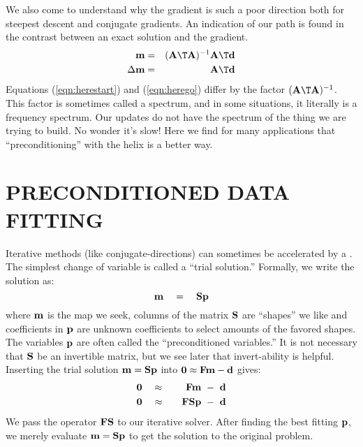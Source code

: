 \par
We also come to understand why the gradient is such a poor direction
both for steepest descent and conjugate gradients.
An indication of our path is found in the contrast between
an exact solution and the gradient.
\begin{eqnarray}
\label{eqn:herestart}
\bold m &=& (\bold A\T\bold A)^{-1}\bold A\T\bold d
\\
\label{eqn:herego}
\Delta \bold m &=& \quad\quad\quad \bold A\T\bold d
\end{eqnarray}
Equations
(\ref{eqn:herestart}) and
(\ref{eqn:herego})
differ by the factor $(\bold A\T\bold A)^{-1}$.
This factor is sometimes called a spectrum,
and in some situations,
it literally is a frequency spectrum.
Our updates do not have the spectrum
of the thing we are trying to build.
No wonder it's slow!
Here we find for many applications that
``preconditioning'' with the helix is a better way.



\section{PRECONDITIONED DATA FITTING}
\par
Iterative methods (like conjugate-directions) can sometimes be accelerated
by a .
The simplest change of variable is called a ``trial solution.''
Formally, we write the solution as:
\begin{equation}
\bold m \quad =\quad \bold S \bold p
\end{equation}
where $\bold m$ is the map we seek,
columns of the matrix $\bold S$ are ``shapes'' we like
and coefficients in $\bold p$ are unknown coefficients
to select amounts of the favored shapes.
The variables $\bold p$  are often called the ``preconditioned variables.''
It is not necessary that $\bold S$ be an invertible matrix,
but we see later that invert-ability  is helpful.
Inserting the trial solution $\bold m = \bold S\bold p$
into $\bold 0\approx\bold F\bold m -\bold d$
gives:
\begin{eqnarray}
\bold 0 \quad & \approx & \quad  \bold F \bold m \ -\  \bold d
\\
\bold 0 \quad & \approx & \quad  \bold F \bold S \bold p \ -\  \bold d
\end{eqnarray}
We pass the operator $\bold F \bold S$ to our iterative solver.
After finding the best fitting                                      $\bold p$,
we merely evaluate
                                                $ \bold m = \bold S \bold p$
to get the solution to the original problem.

